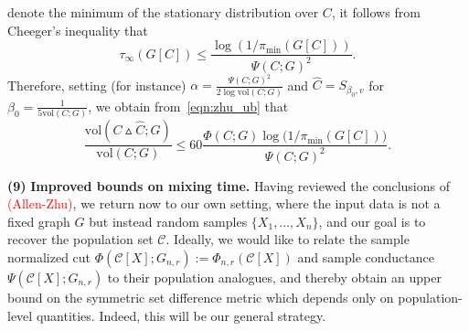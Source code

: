 \documentclass{article}
\newcommand{\vol}{\mathrm{vol}}
\newcommand{\1}{\mathbf{1}}
\newcommand{\mc}[1]{\mathcal{#1}}
\newcommand{\wh}[1]{\widehat{#1}}
\theoremstyle{alden}
\theoremstyle{aldenthm}
\theoremstyle{definition}
\theoremstyle{remark}
\begin{document}
denote the minimum of the stationary distribution over $C$, it follows from Cheeger's inequality that 
\begin{equation}
\label{eqn:mixing_time_cheeger}
\tau_{\infty}(G[C]) \leq \frac{\log( 1/\pi_{\min}(G[C]))}{\Psi(C;G)^2}.
\end{equation}
Therefore, setting (for instance) $\alpha = \frac{\Psi(C;G)^2}{2\log \vol(C;G)}$ and $\wh{C} = S_{\beta_0,v}$ for $\beta_0 = \frac{1}{5 \vol(C;G)}$, we obtain from~\eqref{eqn:zhu_ub} that 
\begin{equation}
\label{eqn:zhu_ub2}
\frac{\vol(C \vartriangle \wh{C};G)}{\vol(C; G)} \leq 60\frac{\Phi(C;G) \log\bigl( 1/\pi_{\min}(G[C])\bigr)}{\Psi(C;G)^2}.
\end{equation}

\textbf{(9)} \textbf{Improved bounds on mixing time.} Having reviewed the conclusions of \textcolor{red}{(Allen-Zhu)}, we return now to our own setting, where the input data is not a fixed graph $G$ but instead random samples $\{X_1,\ldots,X_n\}$, and our goal is to recover the population set $\mc{C}$. Ideally, we would like to relate the sample normalized cut $\Phi(\mc{C}[X];G_{n,r}) := \Phi_{n,r}(\mc{C}[X])$ and sample conductance $\Psi(\mc{C}[X];G_{n,r})$ to their population analogues, and thereby obtain an upper bound on the symmetric set difference metric which depends only on population-level quantities. Indeed, this will be our general strategy. 
\end{document}
